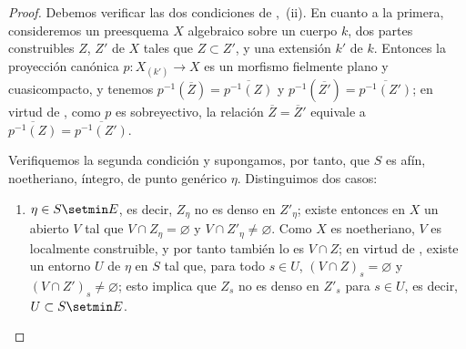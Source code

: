 \begin{proof}
Debemos verificar las dos condiciones de ,~(ii).
En cuanto a la primera, consideremos un preesquema $X$ algebraico sobre un cuerpo $k$, dos partes construibles $Z$, $Z'$ de $X$ tales que $Z\subset Z'$, y una extensión $k'$ de $k$.
Entonces la proyección canónica $p:X_{(k')}\to X$ es un morfismo fielmente plano y cuasicompacto, y tenemos $p^{-1}(\overline{Z})=\overline{p^{-1}(Z)}$ y $p^{-1}(\overline{Z'})=\overline{p^{-1}(Z')}$; en virtud de , como $p$ es sobreyectivo, la relación $\overline{Z}=\overline Z'$ equivale a $\overline{p^{-1}(Z)}=\overline{p^{-1}(Z')}$.

Verifiquemos la segunda condición y supongamos, por tanto, que $S$ es afín, noetheriano, íntegro, de punto genérico $\eta$.
Distinguimos dos casos:
\begin{enumerate}[label=\upshape{$\arabic{enumi}^\circ$}]
  \item $\eta\in S\setmin E$, es decir, $Z_\eta$ no es denso en $Z'_\eta$; existe entonces en $X$ un abierto $V$ tal que $V\cap Z_\eta=\varnothing$ y $V\cap Z'_\eta\neq\varnothing$.
  Como $X$ es noetheriano, $V$ es localmente construible, y por tanto también lo es $V\cap Z$; en virtud de , existe un entorno $U$ de $\eta$ en $S$ tal que, para todo $s\in U$, $(V\cap Z)_s=\varnothing$ y $(V\cap Z')_s\neq\varnothing$; esto implica que $Z_s$ no es denso en $Z'_s$ para $s\in U$, es decir, $U\subset S\setmin E$.



\end{enumerate}
\end{proof}
